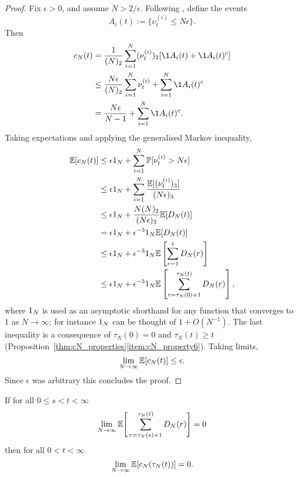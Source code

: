\begin{proof}
Fix $\epsilon>0$, and assume $N>2/\epsilon$.
Following \textcite{mohle2003}, define the events
\begin{equation}\label{eq:define_Ai_events}
A_i(t) := \{ \nu_t^{(i)} \leq N\epsilon \} .
\end{equation}
Then
\begin{align*}
c_N(t)
&= \frac{1}{(N)_2} \sum_{i=1}^N (\nu_t^{(i)})_2 [\1{A_i(t)} + \1{A_i(t)^c}] \\
&\leq \frac{N\epsilon}{(N)_2} \sum_{i=1}^N \nu_t^{(i)}
        + \sum_{i=1}^N \1{A_i(t)^c} \\
&= \frac{N\epsilon}{N-1} + \sum_{i=1}^N \1{A_i(t)^c} .
\end{align*}
Taking expectations and applying the generalised Markov inequality,
\begin{align*}
\mathbb{E}[c_N(t)]
&\leq \epsilon1_N + \sum_{i=1}^N \mathbb{P}[ \nu_t^{(i)} > N\epsilon ] \\
&\leq \epsilon1_N 
        + \sum_{i=1}^N \frac{\mathbb{E}[ (\nu_t^{(i)})_3 ]}{(N\epsilon)_3} \\
&\leq \epsilon1_N + \frac{N(N)_2}{(N\epsilon)_3} \mathbb{E}[ D_N(t) ] \\
&= \epsilon1_N + \epsilon^{-3}1_N \mathbb{E}[ D_N(t) ] \\
&\leq \epsilon1_N + \epsilon^{-3}1_N 
        \mathbb{E}\left[ \sum_{r=1}^t D_N(r) \right] \\
&\leq \epsilon1_N + \epsilon^{-3}1_N
        \mathbb{E}\left[ \sum_{r=\tau_N(0)+1}^{\tau_N(t)} D_N(r) \right] ,
\end{align*}
where $1_N$ is used as an asymptotic shorthand for any function that converges to $1$ as $N\to\infty$; for instance $1_N$ can be thought of $1 + O(N^{-1})$.
The last inequality is a consequence of $\tau_N(0)=0$ and $\tau_N(t) \geq t$ (Proposition~\ref{thm:cN_properties}\ref{item:cN_property6}).
Taking limits, 
\begin{equation*}
\lim_{N\to\infty} \mathbb{E}[c_N(t)] \leq \epsilon .
\end{equation*}
Since $\epsilon$ was arbitrary this concludes the proof.
\end{proof}


\begin{lemma} \label{thm:DNimpliescN_2}
If for all $0 \leq s < t < \infty$
\begin{equation*}
\lim_{ N \rightarrow \infty } \mathbb{E}\Bigg[ \sum_{ r = \tau_N( s ) + 1 }^{ \tau_N( t ) } D_N( r ) \Bigg] = 0
\end{equation*}
then for all $ 0 < t < \infty $
\begin{equation*}
\lim_{ N \rightarrow \infty } \mathbb{E}[ c_N( \tau_N(t) ) ] = 0 .
\end{equation*}
\end{lemma}

